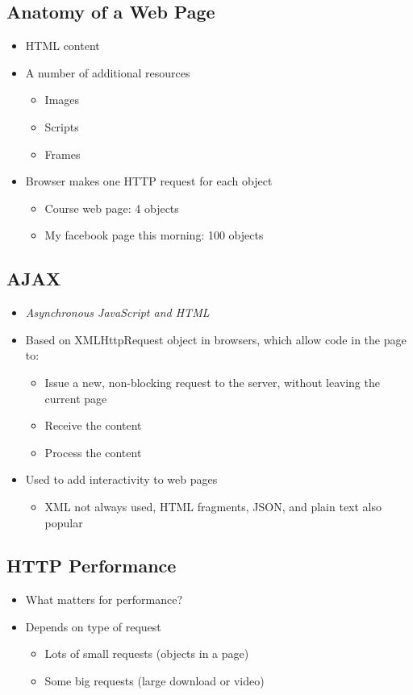 \subsection{Anatomy of a Web Page}
\begin{itemize}[nosep]
    \item HTML content
    \item A number of additional resources
          \begin{itemize}[nosep]
              \item Images
              \item Scripts
              \item Frames
          \end{itemize}
    \item Browser makes one HTTP request for each object
          \begin{itemize}[nosep]
              \item Course web page: 4 objects
              \item My facebook page this morning: 100 objects
          \end{itemize}
\end{itemize}
\subsection{AJAX}
\begin{itemize}[nosep]
    \item \emph{Asynchronous JavaScript and HTML}
    \item Based on XMLHttpRequest object in browsers, which allow code in the page to:
          \begin{itemize}[nosep]
              \item Issue a new, non-blocking request to the server, without leaving the current page
              \item Receive the content
              \item Process the content
          \end{itemize}
    \item Used to add interactivity to web pages
          \begin{itemize}[nosep]
              \item XML not always used, HTML fragments, JSON, and plain text also popular
          \end{itemize}
\end{itemize}
\subsection{HTTP Performance}
\begin{itemize}
    \item What matters for performance?
    \item Depends on type of request
          \begin{itemize}[nosep]
              \item Lots of small requests (objects in a page)
              \item Some big requests (large download or video)
          \end{itemize}
\end{itemize}

